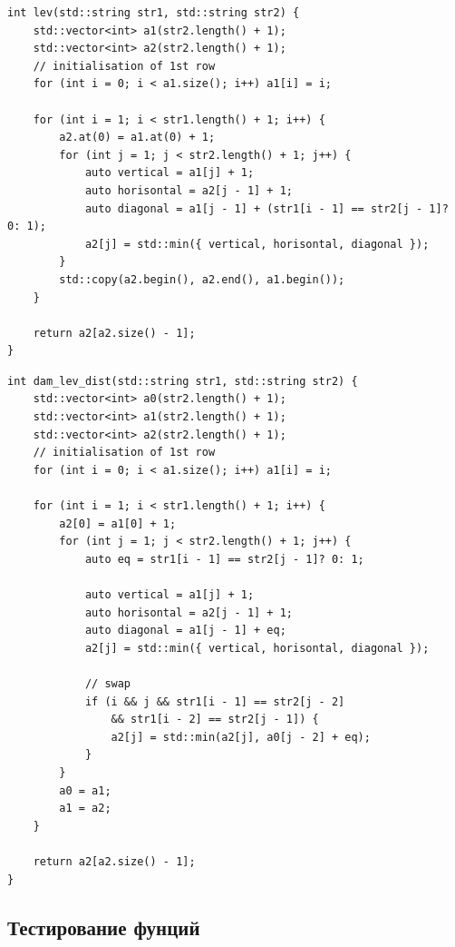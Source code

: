 \documentclass[a4paper,12pt]{article}
\begin{document}
            	\begin{lstlisting}[frame=single,caption=Матричный алгоритм вычисления расстояния Левенштейна, breaklines]
int lev(std::string str1, std::string str2) {
    std::vector<int> a1(str2.length() + 1);
    std::vector<int> a2(str2.length() + 1);
    // initialisation of 1st row
    for (int i = 0; i < a1.size(); i++) a1[i] = i;

    for (int i = 1; i < str1.length() + 1; i++) {
        a2.at(0) = a1.at(0) + 1;
        for (int j = 1; j < str2.length() + 1; j++) {
            auto vertical = a1[j] + 1;
            auto horisontal = a2[j - 1] + 1;
            auto diagonal = a1[j - 1] + (str1[i - 1] == str2[j - 1]? 0: 1);
            a2[j] = std::min({ vertical, horisontal, diagonal });
        }
        std::copy(a2.begin(), a2.end(), a1.begin());
    }

    return a2[a2.size() - 1];
}
   				 \end{lstlisting}
    \newpage
            	\begin{lstlisting}[frame=single,caption=Матричный алгоритм вычисления расстояния Дамерау-Левенштейна, breaklines]
int dam_lev_dist(std::string str1, std::string str2) {
    std::vector<int> a0(str2.length() + 1);
    std::vector<int> a1(str2.length() + 1);
    std::vector<int> a2(str2.length() + 1);
    // initialisation of 1st row
    for (int i = 0; i < a1.size(); i++) a1[i] = i;

    for (int i = 1; i < str1.length() + 1; i++) {
        a2[0] = a1[0] + 1;
        for (int j = 1; j < str2.length() + 1; j++) {
            auto eq = str1[i - 1] == str2[j - 1]? 0: 1;

            auto vertical = a1[j] + 1;
            auto horisontal = a2[j - 1] + 1;
            auto diagonal = a1[j - 1] + eq;
            a2[j] = std::min({ vertical, horisontal, diagonal });

            // swap
            if (i && j && str1[i - 1] == str2[j - 2] 
            	&& str1[i - 2] == str2[j - 1]) {
                a2[j] = std::min(a2[j], a0[j - 2] + eq);
            }
        }
        a0 = a1;
        a1 = a2;
    }

    return a2[a2.size() - 1];
}
				\end{lstlisting}
    \newpage
    \begin{center}
		\subsection{Тестирование фунций}
	\end{center}
\end{document}
